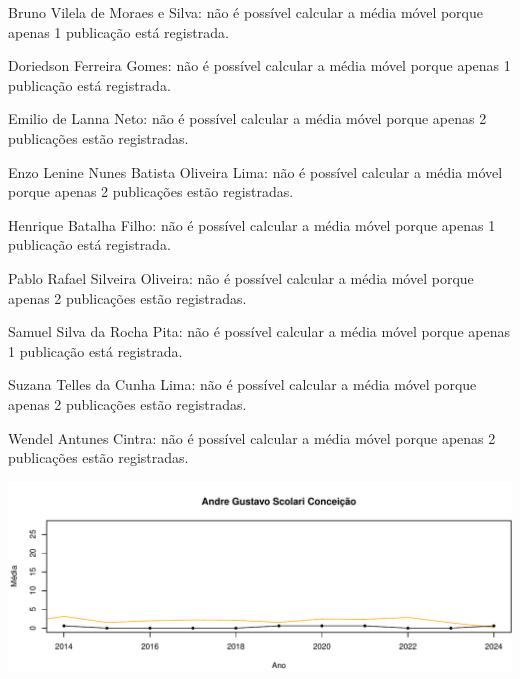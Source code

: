 \documentclass[12pt,brazil]{article}\usepackage[]{graphicx}\usepackage[]{xcolor}
\makeatletter
\def\maxwidth{ %
  \ifdim\Gin@nat@width>\linewidth
    \linewidth
  \else
    \Gin@nat@width
  \fi
}
\makeatother
\begin{document}
 Bruno Vilela de Moraes e Silva: não é possível calcular a média móvel porque apenas 1 publicação está registrada.

 



 Doriedson Ferreira Gomes: não é possível calcular a média móvel porque apenas 1 publicação está registrada.

 



 Emilio de Lanna Neto: não é possível calcular a média móvel porque apenas 2 publicações estão registradas.

 



 Enzo Lenine Nunes Batista Oliveira Lima: não é possível calcular a média móvel porque apenas 2 publicações estão registradas.

 



 Henrique Batalha Filho: não é possível calcular a média móvel porque apenas 1 publicação está registrada.

 



 Pablo Rafael Silveira Oliveira: não é possível calcular a média móvel porque apenas 2 publicações estão registradas.

 



 Samuel Silva da Rocha Pita: não é possível calcular a média móvel porque apenas 1 publicação está registrada.

 



 Suzana Telles da Cunha Lima: não é possível calcular a média móvel porque apenas 2 publicações estão registradas.

 



 Wendel Antunes Cintra: não é possível calcular a média móvel porque apenas 2 publicações estão registradas.

 





{\centering \includegraphics[width=\maxwidth]{figure/mediamovel-1} 

}
\end{document}

